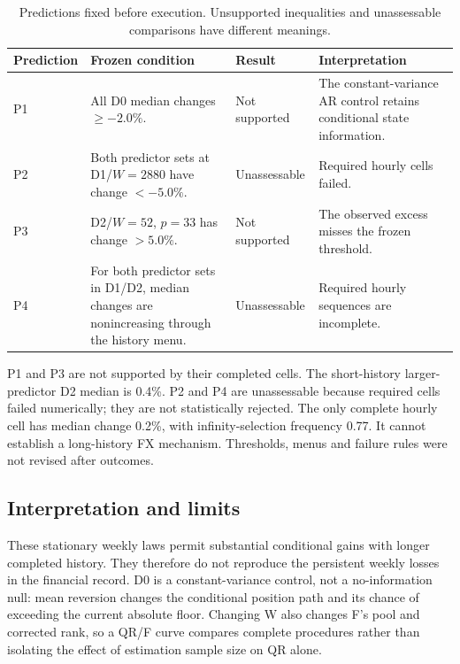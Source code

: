 \begin{table}[htbp]\centering\footnotesize

\caption{Predictions fixed before execution. Unsupported inequalities and unassessable comparisons have different meanings.}\label{tab:v8-mc-predictions}

\begin{tabular}{lp{5.4cm}p{2cm}p{4cm}}\toprule Prediction & Frozen condition & Result & Interpretation\\\midrule
P1 & All D0 median changes $\ge-2.0\%$. & Not supported & The constant-variance AR control retains conditional state information. \\
P2 & Both predictor sets at D1/$W=2880$ have change $<-5.0\%$. & Unassessable & Required hourly cells failed. \\
P3 & D2/$W=52$, $p=33$ has change $>5.0\%$. & Not supported & The observed excess misses the frozen threshold. \\
P4 & For both predictor sets in D1/D2, median changes are nonincreasing through the history menu. & Unassessable & Required hourly sequences are incomplete. \\
\bottomrule\end{tabular}\end{table}

P1 and P3 are not supported by their completed cells. The short-history larger-predictor D2 median is 0.4\%. P2 and P4 are unassessable because required cells failed numerically; they are not statistically rejected. The only complete hourly cell has median change 0.2\%, with infinity-selection frequency 0.77. It cannot establish a long-history FX mechanism. Thresholds, menus and failure rules were not revised after outcomes.

\subsection{Interpretation and limits}\label{sup:v8-mc-limits}

These stationary weekly laws permit substantial conditional gains with longer completed history. They therefore do not reproduce the persistent weekly losses in the financial record. D0 is a constant-variance control, not a no-information null: mean reversion changes the conditional position path and its chance of exceeding the current absolute floor. Changing W also changes F's pool and corrected rank, so a QR/F curve compares complete procedures rather than isolating the effect of estimation sample size on QR alone.

